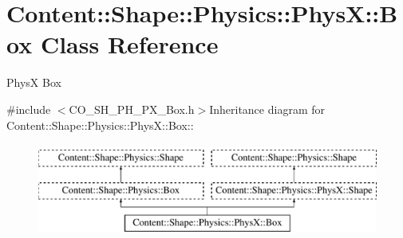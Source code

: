 \hypertarget{classContent_1_1Shape_1_1Physics_1_1PhysX_1_1Box}{
\section{Content::Shape::Physics::PhysX::Box Class Reference}
\label{classContent_1_1Shape_1_1Physics_1_1PhysX_1_1Box}
}


PhysX Box  


{\ttfamily \#include $<$CO\_\-SH\_\-PH\_\-PX\_\-Box.h$>$}Inheritance diagram for Content::Shape::Physics::PhysX::Box::\begin{figure}[H]
\begin{center}
\leavevmode
\includegraphics[height=3cm]{classContent_1_1Shape_1_1Physics_1_1PhysX_1_1Box}
\end{center}
\end{figure}
